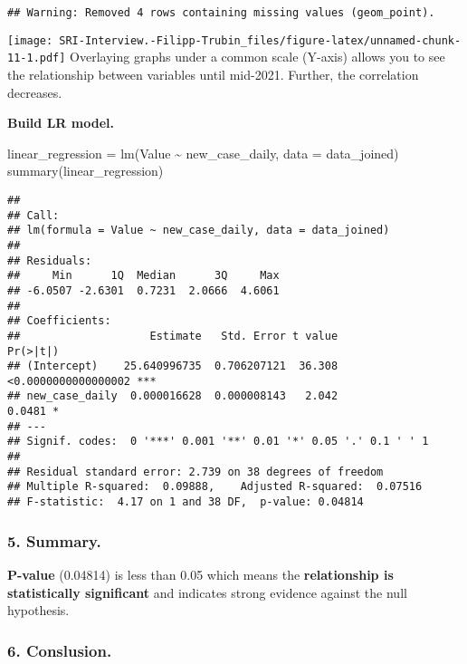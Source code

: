 \documentclass[
]{article}
\newenvironment{Shaded}{\begin{snugshade}}{\end{snugshade}}
\newcommand{\AttributeTok}[1]{\textcolor[rgb]{0.77,0.63,0.00}{#1}}
\newcommand{\FunctionTok}[1]{\textcolor[rgb]{0.00,0.00,0.00}{#1}}
\newcommand{\NormalTok}[1]{#1}
\newcommand{\OtherTok}[1]{\textcolor[rgb]{0.56,0.35,0.01}{#1}}
\newcommand{\SpecialCharTok}[1]{\textcolor[rgb]{0.00,0.00,0.00}{#1}}
\begin{document}
\begin{verbatim}
## Warning: Removed 4 rows containing missing values (geom_point).
\end{verbatim}

\texttt{[image: SRI-Interview.-Filipp-Trubin\_files/figure-latex/unnamed-chunk-11-1.pdf]}
Overlaying graphs under a common scale (Y-axis) allows you to see the
relationship between variables until mid-2021. Further, the correlation
decreases.

\textbf{Build LR model.}

\begin{Shaded}
\begin{Highlighting}[]
\NormalTok{linear\_regression }\OtherTok{=} \FunctionTok{lm}\NormalTok{(Value }\SpecialCharTok{\textasciitilde{}}\NormalTok{ new\_case\_daily, }\AttributeTok{data =}\NormalTok{ data\_joined)}
\FunctionTok{summary}\NormalTok{(linear\_regression)}
\end{Highlighting}
\end{Shaded}

\begin{verbatim}
## 
## Call:
## lm(formula = Value ~ new_case_daily, data = data_joined)
## 
## Residuals:
##     Min      1Q  Median      3Q     Max 
## -6.0507 -2.6301  0.7231  2.0666  4.6061 
## 
## Coefficients:
##                    Estimate   Std. Error t value            Pr(>|t|)    
## (Intercept)    25.640996735  0.706207121  36.308 <0.0000000000000002 ***
## new_case_daily  0.000016628  0.000008143   2.042              0.0481 *  
## ---
## Signif. codes:  0 '***' 0.001 '**' 0.01 '*' 0.05 '.' 0.1 ' ' 1
## 
## Residual standard error: 2.739 on 38 degrees of freedom
## Multiple R-squared:  0.09888,    Adjusted R-squared:  0.07516 
## F-statistic:  4.17 on 1 and 38 DF,  p-value: 0.04814
\end{verbatim}

\hypertarget{summary.}{%
\subsubsection{5. Summary.}\label{summary.}}

\textbf{P-value} (0.04814) is less than 0.05 which means the
\textbf{relationship is statistically significant} and indicates strong
evidence against the null hypothesis.

\hypertarget{conslusion.}{%
\subsubsection{6. Conslusion.}\label{conslusion.}}
\end{document}
